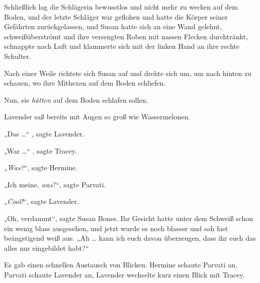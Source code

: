 Schließlich lag die Schlägerin bewusstlos und nicht mehr zu wecken auf dem Boden, und der letzte Schläger war geflohen und hatte die Körper seiner Gefährten zurückgelassen, und Susan hatte sich an eine Wand gelehnt, schweißüberströmt und ihre versengten Roben mit nassen Flecken durchtränkt, schnappte nach Luft und klammerte sich mit der linken Hand an ihre rechte Schulter.

Nach einer Weile richtete sich Susan auf und drehte sich um, um nach hinten zu schauen, wo ihre Mithexen auf dem Boden schliefen.

Nun, sie \emph{hätten} auf dem Boden schlafen sollen.

Lavender saß bereits mit Augen so groß wie Wassermelonen.

„Das …“ , sagte Lavender.

„War …“ , sagte Tracey.

„\emph{Was?}“, sagte Hermine.

„Ich meine, \emph{was}?“, sagte Parvati.

„\emph{Cool!}“, sagte Lavender.

„Oh, verdammt“, sagte Susan Bones. Ihr Gesicht hatte unter dem Schweiß schon ein wenig blass ausgesehen, und jetzt wurde es noch blasser und sah fast beängstigend weiß aus.
„Ah … kann ich euch davon überzeugen, dass ihr euch das alles nur eingebildet habt?“

Es gab einen schnellen Austausch von Blicken. Hermine schaute Parvati an, Parvati schaute Lavender an, Lavender wechselte kurz einen Blick mit Tracey.


